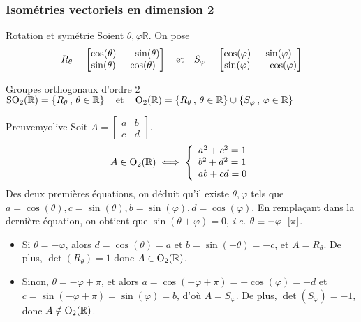     \subsubsection{Isométries vectoriels en dimension 2}

    \begin{defi}{Rotation et symétrie}{}
        Soient $\theta, \varphi \mathbb{R}$. On pose 
        \[ R_{\theta} = \begin{bmatrix}
            \cos(\theta) & -\sin(\theta) \\
            \sin(\theta) & \cos(\theta)
        \end{bmatrix} \quad \text{et} \quad S_{\varphi} = \begin{bmatrix}
            \cos(\varphi) & \sin(\varphi) \\
            \sin(\varphi) & -\cos(\varphi)
        \end{bmatrix} \]   
    \end{defi}

    \begin{prop}{Groupes orthogonaux d’ordre $2$}{}
        $\operatorname{SO}_2(\mathbb{R}) = \left\{ R_{\theta} \, , \, \theta \in \mathbb{R} \right\} \quad \text{et} \quad \operatorname{O}_2(\mathbb{R}) = \left\{ R_{\theta} \, , \, \theta \in \mathbb{R} \right\} \cup \left\{ S_{\varphi} \, , \, \varphi \in \mathbb{R} \right\}$
    \end{prop}

    \begin{demo}{Preuve}{myolive}
        Soit $A = \begin{bmatrix}
            a & b \\
            c & d
        \end{bmatrix}$.
        \[ A \in \operatorname{O}_2(\mathbb{R}) \iff \left\{ \begin{array}{l}
            a^2 + c^2 = 1 \\
            b^2 + d^2 = 1 \\
            ab + cd = 0
        \end{array} \right. \] 
        Des deux premières équations, on déduit qu’il existe $\theta, \varphi$ tels que $a = \cos(\theta), c = \sin(\theta), b = \sin(\varphi), d = \cos(\varphi)$. En remplaçant dans la dernière équation, on obtient que $\sin(\theta + \varphi) = 0$, \textit{i.e.} $\eqmodulo{\theta}{-\varphi}{\pi}$.
        \begin{itemize}
            \item Si $\theta = -\varphi$, alors $d = \cos(\theta) = a$ et $b = \sin(-\theta) = -c$, et $A = R_{\theta}$. De plus, $\det(R_{\theta}) = 1$ donc $A \in \operatorname{O}_2(\mathbb{R})$.
            \item Sinon, $\theta = - \varphi + \pi$, et alors $a = \cos(-\varphi + \pi) = - \cos(\varphi) = -d$ et $c = \sin(-\varphi + \pi) = \sin(\varphi) = b$, d’où $A = S_{\varphi}$. De plus, $\det(S_{\varphi}) = -1$, donc $A \notin \operatorname{O}_2(\mathbb{R})$.
        \end{itemize}
    \end{demo}

